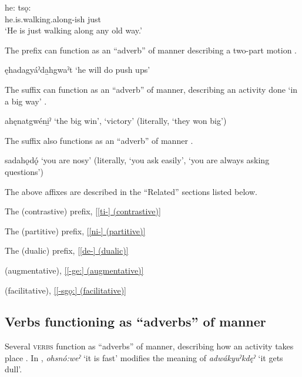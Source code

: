 \ea\label{ex:advex12} 

 \gll {}he: tsǫ: \\
he.is.walking.along-ish just\\
\glt ‘He is just walking along any old way.’

\z 

The  \textsc{\dualic} prefix can function as an “adverb” of manner describing a two-part motion .

\ea\label{ex:advex13} ęhadagyáˀda̱hgwaˀt ‘he will do push ups’ 
\z
	
The  \textsc{\augmentative} suffix can function as an “adverb” of manner, describing an activity done ‘in a big way’ .

\ea\label{ex:advex14} 
ahęnatgwéni̱ˀ ‘the big win’, ‘victory’ (literally, ‘they won big’)
\z

The  \textsc{\facilitative} suffix also functions as an “adverb” of manner .

\ea\label{ex:advex15} 
sadahǫdǫ́ ‘you are nosy’ (literally, ‘you ask easily', ‘you are always asking questions') 
\z

The above affixes are described in the “Related”  sections listed below.

\begin{CayugaRelated}
\item{}The  (contrastive) prefix, \ref{[ti-] (contrastive)}

\item{}The  (partitive) prefix, \ref{[ni-] (partitive)}

\item{}The  (dualic) prefix, \ref{[de-] (dualic)}

\item{} (augmentative), \ref{[-ge:] (augmentative)}

\item{} (facilitative), \ref{[-sgǫ:] (facilitative)}
\end{CayugaRelated}

\subsection{Verbs functioning as “adverbs” of manner}
Several \textsc{verbs} function as “adverbs” of manner, describing how an activity takes place . In , \textit{ohsnó:weˀ} ‘it is fast’ modifies the meaning of \textit{adwákyuˀkdęˀ} ‘it gets dull’.

